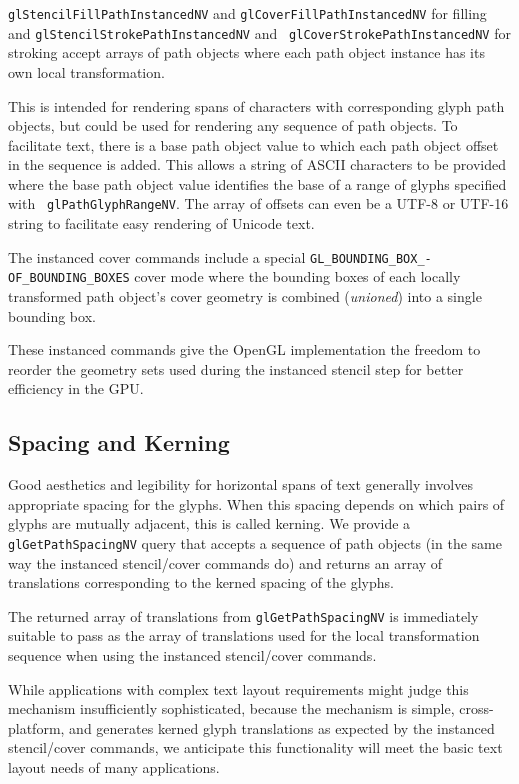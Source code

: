 {\tt glStencilFillPathInstancedNV} and {\tt glCoverFillPathInstancedNV}
for filling and {\tt glStencilStrokePathInstancedNV} and {\tt
glCoverStrokePathInstancedNV} for stroking accept arrays of path objects
where each path object instance has its own local transformation.

This is intended for rendering spans of characters with corresponding
glyph path objects, but could be used for rendering any sequence of
path objects.  To facilitate text, there is a base path object value to
which each path object offset in the sequence is added.  This allows a
string of ASCII characters to be provided where the base path object
value identifies the base of a range of glyphs specified with {\tt
glPathGlyphRangeNV}.  The array of offsets can even be a UTF-8 or UTF-16
string to facilitate easy rendering of Unicode text.

The instanced cover commands include a special
{\tt GL\_BOUNDING\_BOX\_-OF\_BOUNDING\_BOXES} cover mode where the bounding boxes
of each locally transformed path object's cover geometry is combined
({\em unioned}) into a single bounding box.

These instanced commands give the OpenGL implementation the freedom to
reorder the geometry sets used during the instanced stencil step for
better efficiency in the GPU.  

\subsection{Spacing and Kerning}

Good aesthetics and legibility for horizontal spans of text generally
involves appropriate spacing for the glyphs.  When this spacing depends
on which pairs of glyphs are mutually adjacent, this is called kerning.
We provide a {\tt glGetPathSpacingNV} query that accepts a sequence of path objects
(in the same way the instanced stencil/cover commands do) and returns an
array of translations corresponding to the kerned spacing of the glyphs.

The returned array of translations from {\tt glGetPathSpacingNV} is immediately
suitable to pass as the array of translations used for the local
transformation sequence when using the instanced stencil/cover commands.

While applications with complex text layout requirements might judge this
mechanism insufficiently sophisticated, because the mechanism is simple,
cross-platform, and generates kerned glyph translations as expected by
the instanced stencil/cover commands, we anticipate this functionality
will meet the basic text layout needs of many applications.

